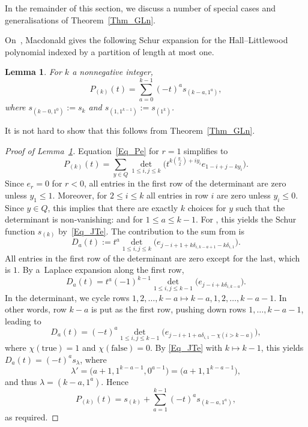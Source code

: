 \documentclass[pdftex]{sigma}
\numberwithin{equation}{section}
\newtheorem{Lemma}[Theorem]{Lemma}
\renewcommand{\leq}{\leqslant}
\newcommand{\la}{\lambda}
\begin{document}
In the remainder of this section, we discuss a number of special cases
and generalisations of Theorem~\ref{Thm_GLn}.

On~\cite[p.~214]{Macdonald95}, Macdonald gives the following
Schur expansion for the Hall--Littlewood polynomial indexed by
a partition of length at most one.

\begin{Lemma}\label{Lem_Macdonald}
For $k$ a nonnegative integer,
\[
P_{(k)}(t)=\sum_{a=0}^{k-1} (-t)^a s_{(k-a,1^a)},
\]
where $s_{(k-0,1^0)}:=s_k$ and $s_{(1,1^{k-1})}:=s_{(1^k)}$.
\end{Lemma}

It is not hard to show that this follows from Theorem~\ref{Thm_GLn}.

\begin{proof}[Proof of Lemma~\ref{Lem_Macdonald}]
Equation~\eqref{Eq_Pe} for $r=1$ simplifies to
\[
P_{(k)}(t)=\sum_{y\in Q} \det_{1\leq i,j\leq k}
\bigl(t^{k\binom{y_i}{2}+iy_i} e_{1-i+j-ky_i} \bigr).
\]
Since $e_r=0$ for $r<0$, all entries in the first row of the
determinant are zero unless $y_1\leq 1$.
Moreover, for $2\leq i\leq k$ all entries in row $i$ are zero
unless $y_i\leq 0$.
Since $y\in Q$, this implies that there are exactly $k$ choices for
$y$ such that the determinant is non-vanishing:
 and  for $1\leq a\leq k-1$.
For , this yields the Schur function $s_{(k)}$
by~\eqref{Eq_JTe}.
The contribution to the sum from  is
\[
D_a(t):=t^a \det_{1\leq i,j\leq k}
\bigl(e_{j-i+1+k\delta_{i,k-a+1}-k\delta_{i,1}} \bigr).
\]
All entries in the first row of the determinant are zero except
for the last, which is $1$.
By a~Laplace expansion along the first row,
\[
D_a(t)=t^a (-1)^{k-1} \det_{1\leq i,j\leq k-1}
\bigl(e_{j-i+k\delta_{i,k-a}}\bigr).
\]
In the determinant, we cycle rows
$1,2,\dots,k-a\mapsto k-a,1,2,\dots,k-a-1$.
In other words, row $k-a$ is put as the first row,
pushing down rows $1,\dots,k-a-1$, leading to
\[
D_a(t)=(-t)^a \det_{1\leq i,j\leq k-1}
\bigl(e_{j-i+1+a\delta_{i,1}-\chi(i>k-a)}\bigr),
\]
where $\chi(\text{true})=1$ and $\chi(\text{false})=0$.
By \eqref{Eq_JTe} with $k\mapsto k-1$, this yields
$D_a(t)=(-t)^a s_{\la}$, where
\[
\la'=\bigl(a+1,1^{k-a-1},0^{a-1}\bigr)=\bigl(a+1,1^{k-a-1}\bigr),
\]
and thus $\la=(k-a,1^a)$.
Hence
\[
P_{(k)}(t)=s_{(k)}+\sum_{a=1}^{k-1} (-t)^a s_{(k-a,1^a)},
\]
as required.
\end{proof}
\end{document}
